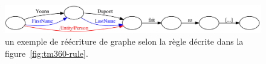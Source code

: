 \documentclass[citation\_needed]{subfiles}
\begin{document}
\begin{figure}[ht!]
\centering
\includegraphics[scale=0.6]{images/Luxid/sentence1}
\caption{un exemple de réécriture de graphe selon la règle décrite dans la figure\ \ref{fig:tm360-rule}.}
\label{fig:tm360-application}
\end{figure}
\end{document}

